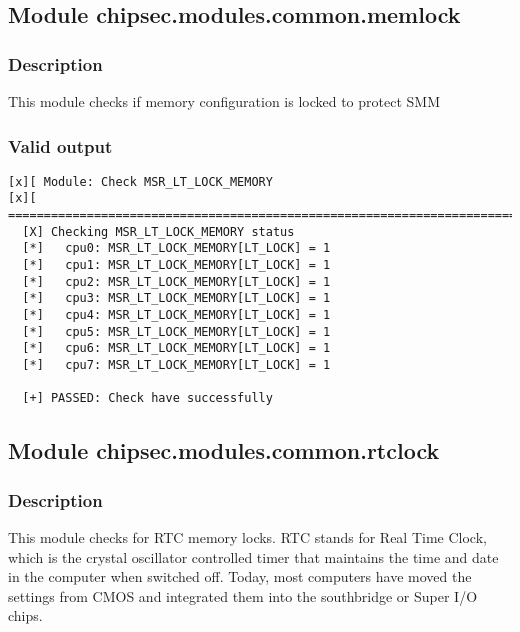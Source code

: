 \hypertarget{module-chipsec.modules.common.memlock}{%
\subsection{Module
chipsec.modules.common.memlock}\label{module-chipsec.modules.common.memlock}}

\hypertarget{description-8}{%
\subsubsection{Description}\label{description-8}}

This module checks if memory configuration is locked to protect SMM

\hypertarget{valid-output-8}{%
\subsubsection{Valid output}\label{valid-output-8}}

\begin{verbatim}
[x][ Module: Check MSR_LT_LOCK_MEMORY
[x][ =======================================================================
  [X] Checking MSR_LT_LOCK_MEMORY status
  [*]   cpu0: MSR_LT_LOCK_MEMORY[LT_LOCK] = 1
  [*]   cpu1: MSR_LT_LOCK_MEMORY[LT_LOCK] = 1
  [*]   cpu2: MSR_LT_LOCK_MEMORY[LT_LOCK] = 1
  [*]   cpu3: MSR_LT_LOCK_MEMORY[LT_LOCK] = 1
  [*]   cpu4: MSR_LT_LOCK_MEMORY[LT_LOCK] = 1
  [*]   cpu5: MSR_LT_LOCK_MEMORY[LT_LOCK] = 1
  [*]   cpu6: MSR_LT_LOCK_MEMORY[LT_LOCK] = 1
  [*]   cpu7: MSR_LT_LOCK_MEMORY[LT_LOCK] = 1

  [+] PASSED: Check have successfully
\end{verbatim}

\hypertarget{module-chipsec.modules.common.rtclock}{%
\subsection{Module
chipsec.modules.common.rtclock}\label{module-chipsec.modules.common.rtclock}}

\hypertarget{description-9}{%
\subsubsection{Description}\label{description-9}}

This module checks for RTC memory locks. RTC stands for Real Time Clock,
which is the crystal oscillator controlled timer that maintains the time
and date in the computer when switched off. Today, most computers have
moved the settings from CMOS and integrated them into the southbridge or
Super I/O chips.

